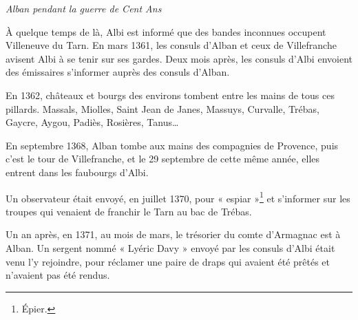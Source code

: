 
\begin{center}
    {\Large\itshape Alban pendant la guerre de Cent Ans}
\end{center}

\vspace{1cm}

À quelque temps de là, Albi est informé que des bandes inconnues
occupent Villeneuve du Tarn. En mars 1361, les consuls d'Alban et
ceux de Villefranche avisent Albi à se tenir sur ses gardes.
Deux mois après, les consuls d'Albi envoient des émissaires
s'informer auprès des consuls d'Alban.

\medskip

En 1362, châteaux et bourgs des environs tombent entre les mains
de tous ces pillards. Massals, Miolles, Saint Jean de Janes,
Massuys, Curvalle, Trébas, Gaycre, Aygou, Padiès, Rosières,
Tanus\ldots

\medskip

En septembre 1368, Alban tombe aux mains des compagnies de
Provence, puis c'est le tour de Villefranche, et le 29 septembre
de cette même année, elles entrent dans les faubourgs d'Albi.

\medskip

Un observateur était envoyé, en juillet 1370, pour
« espiar »\footnote{Épier.} et s'informer sur les troupes qui venaient de
franchir le Tarn au bac de Trébas.

\medskip

Un an après, en 1371, au mois de mars, le trésorier du comte
d'Armagnac est à Alban. Un sergent nommé « Lyéric Davy »
envoyé par les consuls d'Albi était venu l'y rejoindre,
pour réclamer une paire de draps qui avaient été prêtés
et n'avaient pas été rendus.

